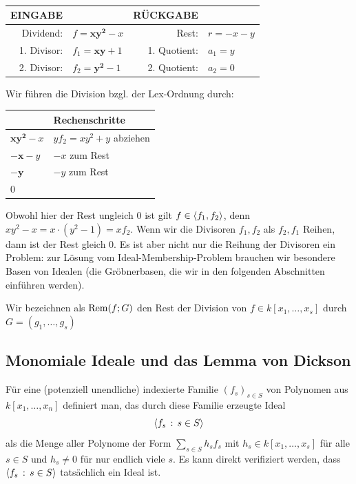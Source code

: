 \documentclass[11pt]{article}
\numberwithin{equation}{section}
\begin{document}
\begin{beispiel} { \ }  
\begin{center} 
\begin{tabular}{rl|rl} 	
	EINGABE&  &  RÜCKGABE & 
	\\ \hline Dividend: & $f=\mathbf{x y^2} - x$ &  Rest: & $ r= - x - y$
	\\ 1. Divisor: & $f_1=\mathbf{xy} + 1$ & 1. Quotient: & $a_1= y $ 
	\\ 2. Divisor: & $f_2=\mathbf{y^2} - 1$ & 2. Quotient: & $a_2= 0 $
\end{tabular}
\end{center}  

Wir führen die Division bzgl. der Lex-Ordnung durch: 

\begin{center} 
\renewcommand{\arraystretch}{1.5} 
\begin{tabular}{l|l} 
	& Rechenschritte
	\\ \hline $\mathbf{x y^2} -x $ & $ y f_2 = x y^2 + y $ abziehen  
	\\ 
	$-\mathbf{x} - y $ & $-x$ zum Rest 
	\\ 
	$- \mathbf{y}$ & $-y$ zum Rest
	\\  $0$ 
\end{tabular} 
\end{center} 

Obwohl hier der Rest ungleich $0$ ist gilt $f \in \left< f_1,f_2 \right>$, denn $x y^2 - x = x \cdot (y^2 - 1)  = x f_2$. Wenn wir die Divisoren $f_1, f_2$ als $f_2, f_1$ Reihen, dann ist der Rest gleich $0$. Es ist aber nicht nur die Reihung der Divisoren ein Problem: zur Lösung vom Ideal-Membership-Problem brauchen wir besondere Basen von Idealen (die Gröbnerbasen, die wir in den folgenden Abschnitten einführen werden). 
\end{beispiel} 

\begin{definition} 
	Wir bezeichnen als  $\operatorname{Rem}(f; G)$ den Rest der Division von $f \in k[x_1,\ldots,x_s]$ durch $G=(g_1,\ldots,g_s)$ 
\end{definition} 

\subsection{Monomiale Ideale und das Lemma von Dickson}

\begin{definition} 
	Für eine (potenziell unendliche) indexierte Familie $(f_s)_{s \in S}$ von Polynomen aus 
	 $k[x_1,\ldots,x_n]$ definiert man, das durch diese Familie erzeugte Ideal 
	\[
	\left<  f_s \, : \, s \in S  \right> 
	\]
	als die Menge aller Polynome der Form $\sum_{s \in S} h_s f_s$ mit $h_s \in k[x_1,\ldots, x_s]$ für alle $s \in S$ und $h_s \ne 0$ für nur endlich viele $s$. Es kann direkt verifiziert werden, dass $\left<  f_s \, : \, s \in S \right>$ tatsächlich ein Ideal ist. 
\end{definition} 
\end{document}
